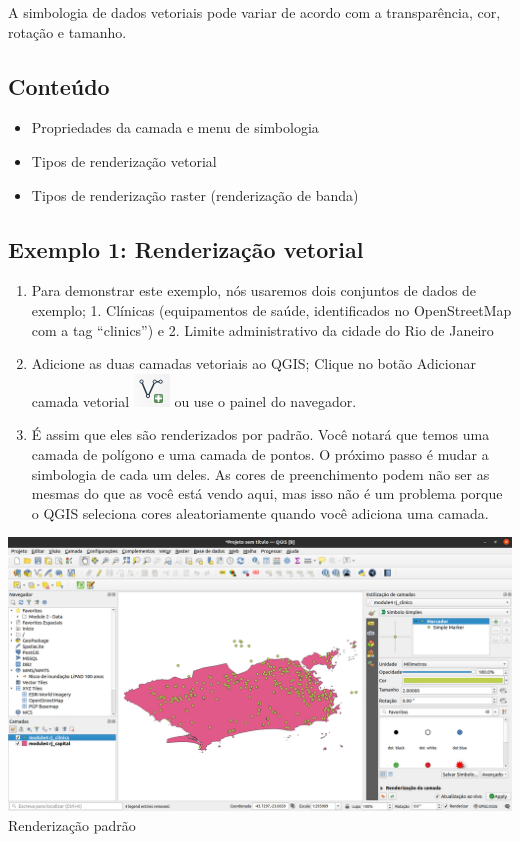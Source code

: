 \documentclass[
  portuguese,
]{krantz}
\providecommand{\tightlist}{%
  \setlength{\itemsep}{0pt}\setlength{\parskip}{0pt}}
\begin{document}
A simbologia de dados vetoriais pode variar de acordo com a transparência, cor, rotação e tamanho.

\hypertarget{conteuxfado}{%
\subsection{\texorpdfstring{\textbf{Conteúdo}}{Conteúdo}}\label{conteuxfado}}

\begin{itemize}
\tightlist
\item
  Propriedades da camada e menu de simbologia
\item
  Tipos de renderização vetorial
\item
  Tipos de renderização raster (renderização de banda)
\end{itemize}

\hypertarget{exemplo-1-renderizauxe7uxe3o-vetorial}{%
\subsection{\texorpdfstring{\textbf{Exemplo 1: Renderização vetorial}}{Exemplo 1: Renderização vetorial}}\label{exemplo-1-renderizauxe7uxe3o-vetorial}}

\begin{enumerate}
\def\labelenumi{\arabic{enumi}.}
\tightlist
\item
  Para demonstrar este exemplo, nós usaremos dois conjuntos de dados de exemplo; 1. Clínicas (equipamentos de saúde, identificados no OpenStreetMap com a tag ``clinics'') e 2. Limite administrativo da cidade do Rio de Janeiro
\item
  Adicione as duas camadas vetoriais ao QGIS; Clique no botão Adicionar camada vetorial \includegraphics{media/modulo4/add-vector.png} ou use o painel do navegador.
\item
  É assim que eles são renderizados por padrão. Você notará que temos uma camada de polígono e uma camada de pontos. O próximo passo é mudar a simbologia de cada um deles. As cores de preenchimento podem não ser as mesmas do que as você está vendo aqui, mas isso não é um problema porque o QGIS seleciona cores aleatoriamente quando você adiciona uma camada.
\end{enumerate}

\includegraphics{media/modulo4/default-vector-render.png}Renderização padrão
\end{document}
